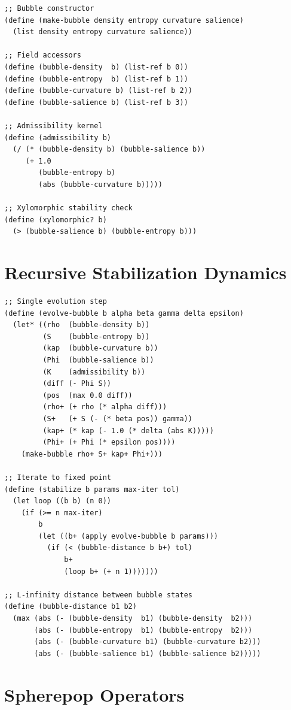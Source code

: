 \documentclass[12pt,oneside]{book}
\theoremstyle{plain}
\theoremstyle{definition}
\theoremstyle{plain}
\begin{document}
\begin{lstlisting}
;; Bubble constructor
(define (make-bubble density entropy curvature salience)
  (list density entropy curvature salience))

;; Field accessors
(define (bubble-density  b) (list-ref b 0))
(define (bubble-entropy  b) (list-ref b 1))
(define (bubble-curvature b) (list-ref b 2))
(define (bubble-salience b) (list-ref b 3))

;; Admissibility kernel
(define (admissibility b)
  (/ (* (bubble-density b) (bubble-salience b))
     (+ 1.0
        (bubble-entropy b)
        (abs (bubble-curvature b)))))

;; Xylomorphic stability check
(define (xylomorphic? b)
  (> (bubble-salience b) (bubble-entropy b)))
\end{lstlisting}

\section{Recursive Stabilization Dynamics}

\begin{lstlisting}
;; Single evolution step
(define (evolve-bubble b alpha beta gamma delta epsilon)
  (let* ((rho  (bubble-density b))
         (S    (bubble-entropy b))
         (kap  (bubble-curvature b))
         (Phi  (bubble-salience b))
         (K    (admissibility b))
         (diff (- Phi S))
         (pos  (max 0.0 diff))
         (rho+ (+ rho (* alpha diff)))
         (S+   (+ S (- (* beta pos)) gamma))
         (kap+ (* kap (- 1.0 (* delta (abs K)))))
         (Phi+ (+ Phi (* epsilon pos))))
    (make-bubble rho+ S+ kap+ Phi+)))

;; Iterate to fixed point
(define (stabilize b params max-iter tol)
  (let loop ((b b) (n 0))
    (if (>= n max-iter)
        b
        (let ((b+ (apply evolve-bubble b params)))
          (if (< (bubble-distance b b+) tol)
              b+
              (loop b+ (+ n 1)))))))

;; L-infinity distance between bubble states
(define (bubble-distance b1 b2)
  (max (abs (- (bubble-density  b1) (bubble-density  b2)))
       (abs (- (bubble-entropy  b1) (bubble-entropy  b2)))
       (abs (- (bubble-curvature b1) (bubble-curvature b2)))
       (abs (- (bubble-salience b1) (bubble-salience b2)))))
\end{lstlisting}

\section{Spherepop Operators}
\end{document}
